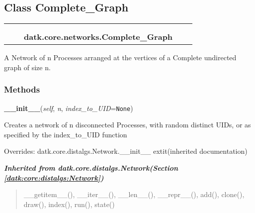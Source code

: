 \subsection{Class Complete\_Graph}

    \label{datk:core:networks:Complete_Graph}
\begin{tabular}{cccccc}
\multicolumn{2}{r}{\settowidth{\BCL}{datk.core.distalgs.Network}\multirow{2}{\BCL}{datk.core.distalgs.Network}}
&&
  \\\cline{3-3}
  &&\multicolumn{1}{c|}{}
&&
  \\
&&\multicolumn{2}{l}{\textbf{datk.core.networks.Complete\_Graph}}
\end{tabular}

A Network of n Processes arranged at the vertices of a Complete undirected 
graph of size n.



  \subsubsection{Methods}

    \vspace{0.5ex}

\hspace{.8\funcindent}\begin{boxedminipage}{\funcwidth}

    \raggedright \textbf{\_\_init\_\_}(\textit{self}, \textit{n}, \textit{index\_to\_UID}={\tt None})

\setlength{\parskip}{2ex}
    Creates a network of n disconnected Processes, with random distinct 
    UIDs, or as specified by the index\_to\_UID function

\setlength{\parskip}{1ex}
      Overrides: datk.core.distalgs.Network.\_\_init\_\_ 	extit{(inherited documentation)}

    \end{boxedminipage}


\large{\textbf{\textit{Inherited from datk.core.distalgs.Network\textit{(Section \ref{datk:core:distalgs:Network})}}}}

\begin{quote}
\_\_getitem\_\_(), \_\_iter\_\_(), \_\_len\_\_(), \_\_repr\_\_(), add(), clone(), draw(), index(), run(), state()
\end{quote}

